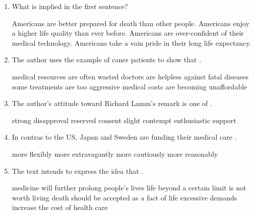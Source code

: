 \begin{enumerate}[resume]
	\item
 What is implied in the first sentence?

\fourchoices
{Americans are better prepared for death than other people.}
{Americans enjoy a higher life quality than ever before.}
{Americans are over-confident of their medical technology.}
{Americans take a vain pride in their long life expectancy.}


\item
The author uses the example of caner patients to show that \lineread.


\fourchoices
{medical resources are often wasted}
{doctors are helpless against fatal diseases}
{some treatments are too aggressive}
{medical costs are becoming unaffordable}


\item
The author's attitude toward Richard Lamm's remark is one of \lineread.


\fourchoices
{strong disapproval}
{reserved consent}
{slight contempt}
{enthusiastic support}



\item
 In contras to the US, Japan and Sweden are funding their medical
care \lineread.


\fourchoices
{more flexibly}
{more extravagantly}
{more cautiously}
{more reasonably}


\item
The text intends to express the idea that \lineread.


\fourchoices
{medicine will further prolong people's lives}
{life beyond a certain limit is not worth living}
{death should be accepted as a fact of life}
{excessive demands increase the cost of health care}


\end{enumerate}



\newpage

